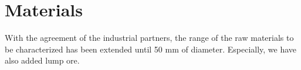 
\section{Materials}
\label{section:materials}

With the agreement of the industrial partners, the range of the raw materials to be characterized has been extended until 50 mm of diameter.
Especially, we have also added lump ore.\\
